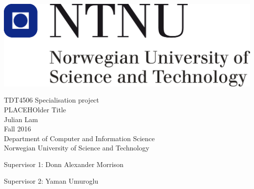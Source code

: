 \thispagestyle{empty}
\includegraphics[scale=0.3]{Figures/ntnu}
\mbox{}\\[6pc]
\begin{center}
\Large{TDT4506 Specialisation project}\\[1pc]
\Huge{PLACEHOlder Title}\\[2pc]

\Large{Julian Lam}\\[1pc]
\large{Fall 2016}\\[2pc]


Department of Computer and Information Science\\
Norwegian University of Science and Technology
\end{center}
\vfill

\noindent Supervisor 1: Donn Alexander Morrison

\noindent Supervisor 2: Yaman Umuroglu